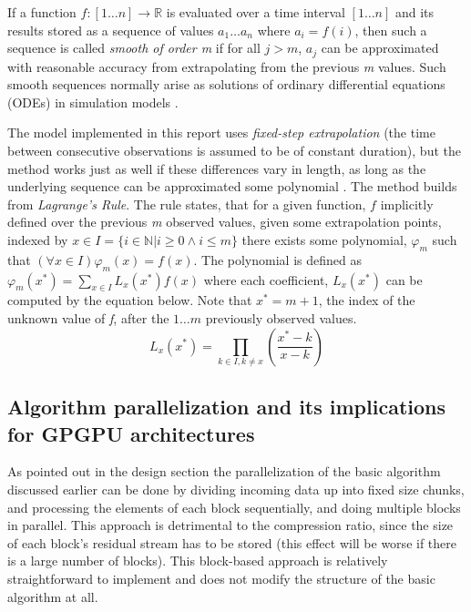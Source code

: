   If a function $f:[1\dots n] \rightarrow \mathbb{R}$ is evaluated over a time interval $[1\dots n]$ and its results stored as a sequence of values 
  $a_{1}\dots a_{n}$ where $a_{i} = f(i)$, then such a sequence is called \textit{smooth of order m} if for all $j>m$, $a_{j}$ can be approximated with reasonable
  accuracy from extrapolating from the previous \textit{m} values. Such smooth sequences normally arise as solutions of ordinary differential equations (ODEs) in
  simulation models \cite{engelson2000lossless}.
  
  The model implemented in this report uses \textit{fixed-step extrapolation} (the time between consecutive observations is assumed to be of constant duration), but
  the method works just as well if these differences vary in length, as long as the underlying sequence can be approximated some polynomial \cite{engelson2000lossless}. 
  The method builds from \textit{Lagrange's Rule}. The rule states, that for a given function, $f$ implicitly defined over the previous \textit{m} 
  observed values, given some extrapolation points, indexed by $x\in I = \{i\in\mathbb{N}|i\geq 0\wedge i\leq m\}$ there exists some polynomial, $\varphi_{m}$ such that 
  $(\forall x\in I) \varphi_{m}(x)=f(x)$. The polynomial is defined as $\varphi_{m}(x^{*})=\sum_{x\in I}L_{x}(x^{*})f(x)$ where each coefficient, $L_{x}(x^{*})$ 
  can be computed by the equation below. Note that $x^{*} = m + 1$, the index of the unknown value of \textit{f}, after the $1\dots m$ previously observed values.
  \begin{equation}
   L_{x}(x^{*}) = \prod_{k\in{I},k\neq x}\left(\frac{x^{*}-k}{x-k}\right)
  \end{equation}

 \subsection{Algorithm parallelization and its implications for GPGPU architectures}
  As pointed out in the design section the parallelization of the basic algorithm discussed earlier can be done by dividing incoming data up into fixed size chunks, and
  processing the elements of each block sequentially, and doing multiple blocks in parallel. This approach is detrimental to the compression ratio, since the size of each
  block's residual stream has to be stored (this effect will be worse if there is a large number of blocks). This block-based approach is relatively straightforward to 
  implement and does not modify the structure of the basic algorithm at all.
  
